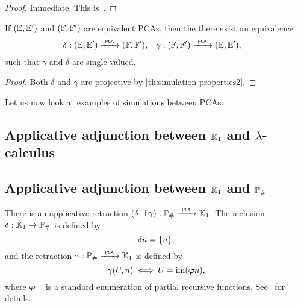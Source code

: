 \begin{proof}
  Immediate. This is~\cite[Corollary 2.5.4]{Longley:94}.
\end{proof}

\begin{corollary}
  \label{th:simulation-properties-more}%
  If $({\mathbb{E}}, {\mathbb{E}'})$ and $({\mathbb{F}}, {\mathbb{F}'})$ are equivalent PCAs, then the 
  there exist an equivalence
  \begin{align*}
    \delta &: ({\mathbb{E}}, {\mathbb{E}'}) \xrightarrow{\scriptscriptstyle\mathsf{\ PCA\ }}{} ({\mathbb{F}}, {\mathbb{F}'}),
    &
    \gamma &: ({\mathbb{F}}, {\mathbb{F}'}) \xrightarrow{\scriptscriptstyle\mathsf{\ PCA\ }}{} ({\mathbb{E}}, {\mathbb{E}'}),
  \end{align*}
  such that $\gamma$ and $\delta$ are single-valued.
\end{corollary}

\begin{proof}
  Both $\delta$ and $\gamma$ are projective by
  \cref{th:simulation-properties2}.
\end{proof}

Let us now look at examples of simulations between PCAs.


\subsection{Applicative adjunction between $\mathbb{K}_1$ and $\lambda$-calculus}
\label{ex:pcamorphism-K1-lambda}%



\subsection{Applicative adjunction between $\mathbb{K}_1$ and $\mathbb{P}_{\#}$}
\label{ex:pcamorphism_K1_RE}%

%
%

There is an applicative retraction $(\delta \dashv \gamma): \mathbb{P}_{\#}
\xrightarrow{\scriptscriptstyle\mathsf{\ PCA\ }}{} \mathbb{K}_1$. The inclusion $\delta: \mathbb{K}_1 \to \mathbb{P}_{\#}$ is defined
by
\begin{equation*}
  \delta n = \{n\},
\end{equation*}
and the retraction $\gamma: \mathbb{P}_{\#} \xrightarrow{\scriptscriptstyle\mathsf{\ PCA\ }}{} \mathbb{K}_1$ is defined by
\begin{equation*}
  \gamma(U, n)
  \iff
  U = \mathrm{im}(\text{\boldmath{$\varphi$}}{n}),
\end{equation*}
where $\text{\boldmath{$\varphi$}}{{-}}$ is a standard enumeration of partial
recursive functions. See~\cite[Proposition 3.3.7]{Longley:94} for
details.


